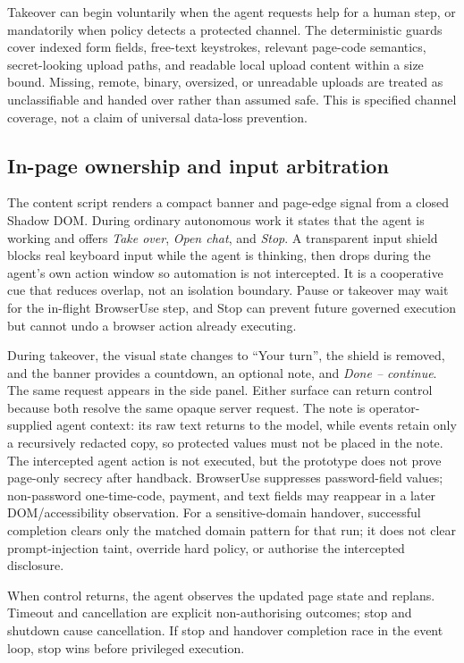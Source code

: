 Takeover can begin voluntarily when the agent requests help for a human step,
or mandatorily when policy detects a protected channel. The deterministic
guards cover indexed form fields, free-text keystrokes, relevant page-code
semantics, secret-looking upload paths, and readable local upload content
within a size bound. Missing, remote, binary, oversized, or unreadable uploads
are treated as unclassifiable and handed over rather than assumed safe. This
is specified channel coverage, not a claim of universal data-loss prevention.

\subsection{In-page ownership and input arbitration}

The content script renders a compact banner and page-edge signal from a closed
Shadow DOM. During ordinary autonomous work it states that the agent is
working and offers \emph{Take over}, \emph{Open chat}, and \emph{Stop}. A
transparent input shield blocks real keyboard input while the agent is
thinking, then drops during the agent's own action window so automation is not
intercepted. It is a cooperative cue that reduces overlap, not an isolation
boundary. Pause or takeover may wait for the in-flight BrowserUse step, and
Stop can prevent future governed execution but cannot undo a browser action
already executing.

During takeover, the visual state changes to ``Your turn'', the shield is
removed, and the banner provides a countdown, an optional note, and
\emph{Done -- continue}. The same request appears in the side panel. Either
surface can return control because both resolve the same opaque server request.
The note is operator-supplied agent context: its raw text returns to the model,
while events retain only a recursively redacted copy, so protected values must
not be placed in the note. The intercepted agent action is not executed, but
the prototype does not prove page-only secrecy after handback. BrowserUse
suppresses password-field values; non-password one-time-code, payment, and text
fields may reappear in a later DOM/accessibility observation.
For a sensitive-domain handover, successful completion clears only the matched
domain pattern for that run; it does not clear prompt-injection taint, override
hard policy, or authorise the intercepted disclosure.

When control returns, the agent observes the updated page state and replans.
Timeout and cancellation are explicit non-authorising outcomes; stop and
shutdown cause cancellation. If stop and handover completion race in the event
loop, stop wins before privileged execution.

